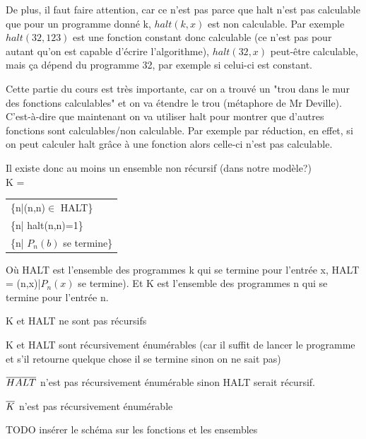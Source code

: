 De plus, il faut faire attention, car ce n'est pas parce que halt n'est pas 
calculable que pour un programme donné k, $halt(k,x)$ est non calculable. Par 
exemple $halt(32,123)$ est une fonction constant donc calculable (ce n'est pas 
pour autant qu'on est capable d'écrire l'algorithme), $halt(32,x)$ peut-être 
calculable, mais ça dépend du 
programme 32, par exemple si celui-ci est constant.

\begin{myrem}
	Cette partie du cours est très importante, car on a trouvé un 
	"trou dans le mur des fonctions calculables" et on va étendre le trou (métaphore
	de Mr Deville). C'est-à-dire que maintenant on va utiliser halt pour montrer 
	que d'autres fonctions sont calculables/non calculable. Par exemple 
	par réduction, en effet, si on peut calculer halt grâce à une fonction 
	alors celle-ci n'est pas calculable.
\end{myrem}

Il existe donc au moins un ensemble non récursif (dans notre 
modèle?)\\
K = 
\begin{tabular}{l}
	\{n|(n,n)$\in$ HALT\}\\
	\{n| halt(n,n)=1\}\\
	\{n| $P_n(b)$ se termine\} \\
\end{tabular}

Où HALT est l'ensemble des programmes k qui se termine pour l'entrée x, 
HALT = {(n,x)|$P_n(x)$ se termine}). Et K est l'ensemble des programmes n qui
se termine pour l'entrée n.

\begin{myprop}
	K et HALT ne sont pas récursifs
\end{myprop}
	
\begin{myprop}
	K et HALT sont récursivement énumérables (car il suffit de lancer le 
	programme et s’il retourne quelque chose il se termine sinon on ne sait 
	pas)
\end{myprop}
	
\begin{myprop}
	$\overline{HALT}$ n'est pas récursivement énumérable sinon HALT 
		serait récursif.
\end{myprop}
	
\begin{myprop}
	$\overline{K}$ n'est pas récursivement énumérable
\end{myprop}
	

TODO insérer le schéma sur les fonctions et les ensembles

